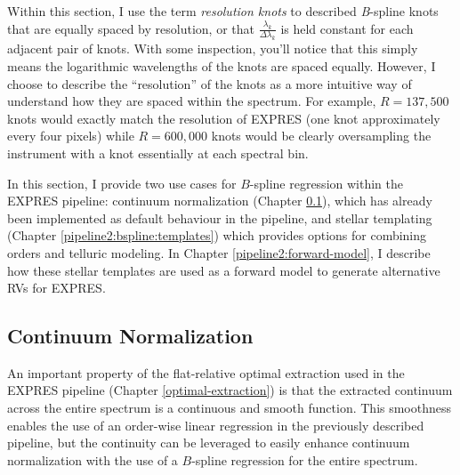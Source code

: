 Within this section, I use the term \textit{resolution knots} to described \textit{B}-spline knots that are equally spaced by resolution, or that $\frac{\lambda_k}{\Delta \lambda_k}$ is held constant for each adjacent pair of knots. With some inspection, you'll notice that this simply means the logarithmic wavelengths of the knots are spaced equally. However, I choose to describe the ``resolution'' of the knots as a more intuitive way of understand how they are spaced within the spectrum. For example, $R=137,500$ knots would exactly match the resolution of EXPRES (one knot approximately every four pixels) while $R=600,000$ knots would be clearly oversampling the instrument with a knot essentially at each spectral bin.

In this section, I provide two use cases for $B$-spline regression within the EXPRES pipeline: continuum normalization (Chapter \ref{pipeline2:bspline:cont-norm}), which has already been implemented as default behaviour in the pipeline, and stellar templating (Chapter \ref{pipeline2:bspline:templates}) which provides options for combining orders and telluric modeling. In Chapter \ref{pipeline2:forward-model}, I describe how these stellar templates are used as a forward model to generate alternative RVs for EXPRES.

\subsection{Continuum Normalization} \label{pipeline2:bspline:cont-norm}

An important property of the flat-relative optimal extraction used in the EXPRES pipeline (Chapter \ref{optimal-extraction}) is that the extracted continuum across the entire spectrum is a continuous and smooth function. This smoothness enables the use of an order-wise linear regression in the previously described pipeline, but the continuity can be leveraged to easily enhance continuum normalization with the use of a $B$-spline regression for the entire spectrum.

